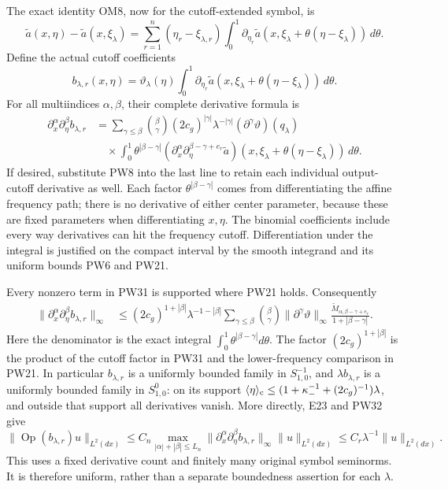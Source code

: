 \documentclass[
  11pt,
]{article}
\begin{document}
The exact identity OM8, now for the cutoff-extended symbol, is \[
 \widetilde a(x,\eta)-\widetilde a(x,\xi_\lambda)
 =\sum_{r=1}^n(\eta_r-\xi_{\lambda,r})
      \int_0^1\partial_{\eta_r}\widetilde a
        (x,\xi_\lambda+\theta(\eta-\xi_\lambda))\,d\theta .
 \tag{PW29}
\] Define the actual cutoff coefficients \[
 b_{\lambda,r}(x,\eta)=\vartheta_\lambda(\eta)
        \int_0^1\partial_{\eta_r}\widetilde a
          (x,\xi_\lambda+\theta(\eta-\xi_\lambda))\,d\theta .
 \tag{PW30}
\] For all multiindices \(\alpha,\beta\), their complete derivative
formula is \[
 \begin{split}
 \partial_x^\alpha\partial_\eta^\beta b_{\lambda,r}
 &=\sum_{\gamma\leq\beta}{\beta\choose\gamma}
       (2c_g)^{|\gamma|}\lambda^{-|\gamma|}
       (\partial^\gamma\vartheta)(q_\lambda)\\
 &\quad{}\times\int_0^1\theta^{|\beta-\gamma|}
       (\partial_x^\alpha
          \partial_\eta^{\beta-\gamma+e_r}\widetilde a)
       (x,\xi_\lambda+\theta(\eta-\xi_\lambda))\,d\theta .
 \end{split}
 \tag{PW31}
\] If desired, substitute PW8 into the last line to retain each
individual output-cutoff derivative as well. Each factor
\(\theta^{|\beta-\gamma|}\) comes from differentiating the affine
frequency path; there is no derivative of either center parameter,
because these are fixed parameters when differentiating \(x,\eta\). The
binomial coefficients include every way derivatives can hit the
frequency cutoff. Differentiation under the integral is justified on the
compact interval by the smooth integrand and its uniform bounds PW6 and
PW21.

Every nonzero term in PW31 is supported where PW21 holds. Consequently
\[
 \begin{split}
 \|\partial_x^\alpha\partial_\eta^\beta b_{\lambda,r}\|_\infty
 &\leq (2c_g)^{1+|\beta|}
         \lambda^{-1-|\beta|}
       \sum_{\gamma\leq\beta}{\beta\choose\gamma}
       \|\partial^\gamma\vartheta\|_\infty
       \frac{\widetilde M_{\alpha,\beta-\gamma+e_r}}
            {1+|\beta-\gamma|}.
 \end{split}
 \tag{PW32}
\] Here the denominator is the exact integral
\(\int_0^1\theta^{|\beta-\gamma|}d\theta\). The factor
\((2c_g)^{1+|\beta|}\) is the product of the cutoff factor in PW31 and
the lower-frequency comparison in PW21. In particular \(b_{\lambda,r}\)
is a uniformly bounded family in \(S^{-1}_{1,0}\), and
\(\lambda b_{\lambda,r}\) is a uniformly bounded family in
\(S^0_{1,0}\): on its support \(\langle\eta\rangle_{\rm c}\leq
(1+\kappa_-^{-1}+(2c_g)^{-1})\lambda\), and outside that support all
derivatives vanish. More directly, E23 and PW32 give \[
 \|\operatorname{Op}(b_{\lambda,r})u\|_{L^2(dx)}
 \leq C_n
   \max_{|\alpha|+|\beta|\leq L_n}
       \|\partial_x^\alpha\partial_\eta^\beta b_{\lambda,r}\|_\infty
       \|u\|_{L^2(dx)}
 \leq C_r\lambda^{-1}\|u\|_{L^2(dx)} .
 \tag{PW33}
\] This uses a fixed derivative count and finitely many original symbol
seminorms. It is therefore uniform, rather than a separate boundedness
assertion for each \(\lambda\).
\end{document}
